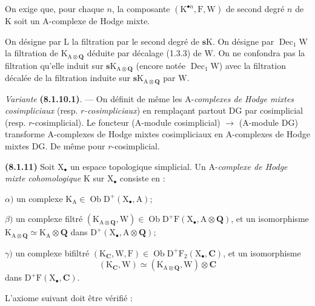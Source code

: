 \documentclass[11pt,leqno]{article}
\begin{document}
On exige que, pour chaque \(n\), la composante \((\mathrm{K}^{\bullet n},\mathrm{F},\mathrm{W})\) de second degré \(n\) de \(\mathrm{K}\) soit un \(\mathrm{A}\)-complexe de Hodge mixte.

On désigne par \(\mathrm{L}\) la filtration par le second degré de \(\mathbf{s}\mathrm{K}\). On désigne par \(\operatorname{Dec}_{1}\mathrm{W}\) la filtration de \(\mathrm{K}_{\mathrm{A}\otimes\mathbf{Q}}\) déduite par décalage (1.3.3) de \(\mathrm{W}\). On ne confondra pas la filtration qu’elle induit sur \(\mathbf{s}\mathrm{K}_{\mathrm{A}\otimes\mathbf{Q}}\) (encore notée \(\operatorname{Dec}_{1}\mathrm{W}\)) avec la filtration décalée de la filtration induite sur \(\mathbf{s}\mathrm{K}_{\mathrm{A}\otimes\mathbf{Q}}\) par \(\mathrm{W}\).

\textit{Variante} \textbf{(8.1.10.1)}. — On définit de même les \(\mathrm{A}\)-\textit{complexes de Hodge mixtes cosimpliciaux} (resp. \textit{\(r\)-cosimpliciaux}) en remplaçant partout \(\mathrm{DG}\) par cosimplicial (resp. \(r\)-cosimplicial). Le foncteur (\(\mathrm{A}\)-module cosimplicial) \(\to\) (\(\mathrm{A}\)-module \(\mathrm{DG}\)) transforme \(\mathrm{A}\)-complexes de Hodge mixtes cosimpliciaux en \(\mathrm{A}\)-complexes de Hodge mixtes \(\mathrm{DG}\). De même pour \(r\)-cosimplicial.

\textbf{(8.1.11)} Soit \(\mathrm{X}_{\bullet}\) un espace topologique simplicial. Un \(\mathrm{A}\)-\textit{complexe de Hodge mixte cohomologique} \(\mathrm{K}\) sur \(\mathrm{X}_{\bullet}\) consiste en :

\(\alpha)\) un complexe \(\mathrm{K}_{\mathrm{A}}\in\operatorname{Ob}\mathrm{D}^{+}(\mathrm{X}_{\bullet},\mathrm{A})\);

\(\beta)\) un complexe filtré \((\mathrm{K}_{\mathrm{A}\otimes\mathbf{Q}},\mathrm{W})\in\operatorname{Ob}\mathrm{D}^{+}\mathrm{F}(\mathrm{X}_{\bullet},\mathrm{A}\otimes\mathbf{Q})\), et un isomorphisme \(\mathrm{K}_{\mathrm{A}\otimes\mathbf{Q}}\simeq\mathrm{K}_{\mathrm{A}}\otimes\mathbf{Q}\) dans \(\mathrm{D}^{+}(\mathrm{X}_{\bullet},\mathrm{A}\otimes\mathbf{Q})\);

\(\gamma)\) un complexe bifiltré \((\mathrm{K}_{\mathbf{C}},\mathrm{W},\mathrm{F})\in\operatorname{Ob}\mathrm{D}^{+}\mathrm{F}_{2}(\mathrm{X}_{\bullet},\mathbf{C})\), et un isomorphisme
\[
(\mathrm{K}_{\mathbf{C}},\mathrm{W})
\simeq
(\mathrm{K}_{\mathrm{A}\otimes\mathbf{Q}},\mathrm{W})\otimes\mathbf{C}
\]
dans \(\mathrm{D}^{+}\mathrm{F}(\mathrm{X}_{\bullet},\mathbf{C})\).

L’axiome suivant doit être vérifié :
\end{document}

